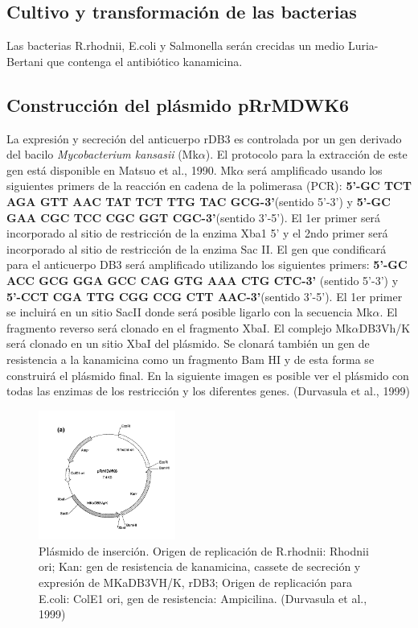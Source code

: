 \documentclass[12pt]{article}
\numberwithin{equation}{section}
\begin{document}
\subsection{Cultivo y transformación de las bacterias}

Las bacterias R.rhodnii, E.coli y Salmonella serán crecidas un medio Luria-Bertani que contenga el antibiótico kanamicina. 


\subsection{Construcción del plásmido pRrMDWK6}

La expresión y secreción del anticuerpo rDB3 es controlada por un gen derivado del bacilo \textit{Mycobacterium kansasii} (Mk$\alpha$). El protocolo para la extracción de este gen está disponible en Matsuo et al., 1990. Mk$\alpha$ será amplificado usando los siguientes primers de la reacción en cadena de la polimerasa (PCR): \textbf{5'-GC TCT AGA GTT AAC TAT TCT TTG TAC GCG-3'}(sentido 5'-3') y \textbf{5'-GC GAA CGC TCC CGC GGT CGC-3'}(sentido 3'-5'). El 1er primer será incorporado al sitio de restricción de la enzima Xba1 5' y el 2ndo primer será incorporado al sitio de restricción de la enzima Sac II. El gen que condificará para el anticuerpo DB3 será amplificado utilizando los siguientes primers: \textbf{5'-GC ACC GCG GGA GCC CAG GTG AAA CTG CTC-3'} (sentido 5'-3') y \textbf{5'-CCT CGA TTG CGG CCG CTT AAC-3'}(sentido 3'-5'). El 1er primer se incluirá en un sitio SacII donde será posible ligarlo con la secuencia Mk$\alpha$. El fragmento reverso será clonado en el fragmento XbaI. El complejo Mk$\alpha$DB3Vh/K será clonado en un sitio XbaI del plásmido. Se clonará también un gen de resistencia a la kanamicina como un fragmento  Bam HI y de esta forma se construirá el plásmido final. En la siguiente imagen es posible ver el plásmido con todas las enzimas de los restricción y los diferentes genes. (Durvasula et al., 1999)

\begin{figure}[!ht]
\begin {center}
\includegraphics[width=0.4\textwidth]{plasmido+.PNG}
\caption{Plásmido de inserción. Origen de replicación de R.rhodnii: Rhodnii ori; Kan: gen de resistencia de kanamicina, cassete de secreción y expresión de MKaDB3VH/K, rDB3; Origen de replicación para E.coli: ColE1 ori, gen de resistencia: Ampicilina. (Durvasula et al., 1999)}
\end {center}
\FloatBarrier
\end{figure}
\end{document}
